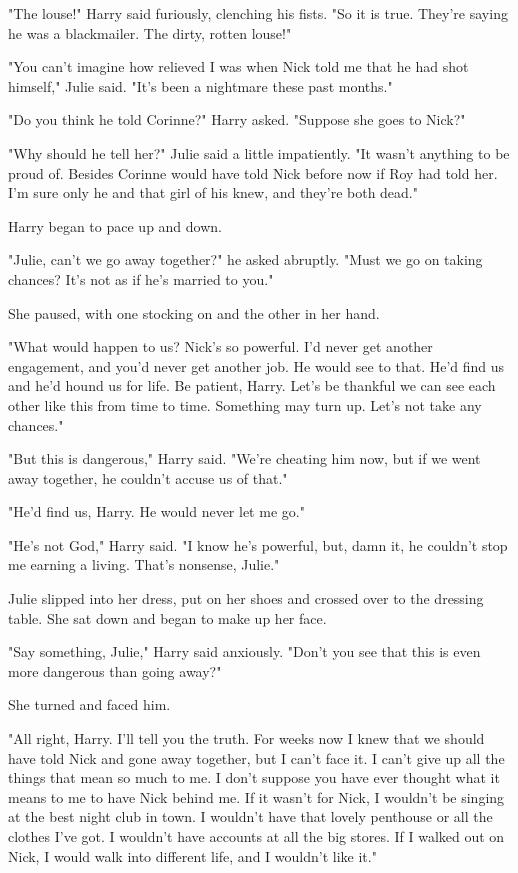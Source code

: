 \documentclass{novel}
\begin{document}
"The louse!" Harry said furiously, clenching his fists. "So it is true. They're saying he was a blackmailer. The dirty, rotten louse!"

"You can't imagine how relieved I was when Nick told me that he had shot himself," Julie said. "It's been a nightmare these past months."

"Do you think he told Corinne?" Harry asked. "Suppose she goes to Nick?"

"Why should he tell her?" Julie said a little impatiently. "It wasn't anything to be proud of. Besides Corinne would have told Nick before now if Roy had told her. I'm sure only he and that girl of his knew, and they're both dead."

Harry began to pace up and down.

"Julie, can't we go away together?" he asked abruptly. "Must we go on taking chances? It's not as if he's married to you."

She paused, with one stocking on and the other in her hand.

"What would happen to us? Nick's so powerful. I'd never get another engagement, and you'd never get another job. He would see to that. He'd find us and he'd hound us for life. Be patient, Harry. Let's be thankful we can see each other like this from time to time. Something may turn up. Let's not take any chances."

"But this is dangerous," Harry said. "We're cheating him now, but if we went away together, he couldn't accuse us of that."

"He'd find us, Harry. He would never let me go."

"He's not God," Harry said. "I know he's powerful, but, damn it, he couldn't stop me earning a living. That's nonsense, Julie."

Julie slipped into her dress, put on her shoes and crossed over to the dressing table. She sat down and began to make up her face.

"Say something, Julie," Harry said anxiously. "Don't you see that this is even more dangerous than going away?"

She turned and faced him.

"All right, Harry. I'll tell you the truth. For weeks now I knew that we should have told Nick and gone away together, but I can't face it. I can't give up all the things that mean so much to me. I don't suppose you have ever thought what it means to me to have Nick behind me. If it wasn't for Nick, I wouldn't be singing at the best night club in town. I wouldn't have that lovely penthouse or all the clothes I've got. I wouldn't have accounts at all the big stores. If I walked out on Nick, I would walk into different life, and I wouldn't like it."
\end{document}
